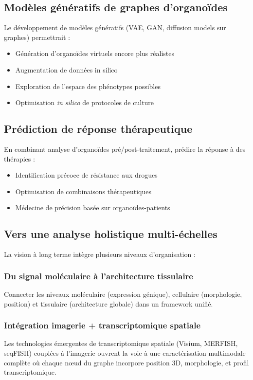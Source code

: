 \subsection{Modèles génératifs de graphes d'organoïdes}

Le développement de modèles génératifs (VAE, GAN, diffusion models sur graphes) permettrait :
\begin{itemize}
    \item Génération d'organoïdes virtuels encore plus réalistes
    \item Augmentation de données in silico
    \item Exploration de l'espace des phénotypes possibles
    \item Optimisation \textit{in silico} de protocoles de culture
\end{itemize}

\subsection{Prédiction de réponse thérapeutique}

En combinant analyse d'organoïdes pré/post-traitement, prédire la réponse à des thérapies :
\begin{itemize}
    \item Identification précoce de résistance aux drogues
    \item Optimisation de combinaisons thérapeutiques
    \item Médecine de précision basée sur organoïdes-patients
\end{itemize}

\subsection{Vers une analyse holistique multi-échelles}

La vision à long terme intègre plusieurs niveaux d'organisation :

\subsubsection{Du signal moléculaire à l'architecture tissulaire}
Connecter les niveaux moléculaire (expression génique), cellulaire (morphologie, position) et tissulaire (architecture globale) dans un framework unifié.

\subsubsection{Intégration imagerie + transcriptomique spatiale}
Les technologies émergentes de transcriptomique spatiale (Visium, MERFISH, seqFISH) couplées à l'imagerie ouvrent la voie à une caractérisation multimodale complète où chaque nœud du graphe incorpore position 3D, morphologie, et profil transcriptomique.

